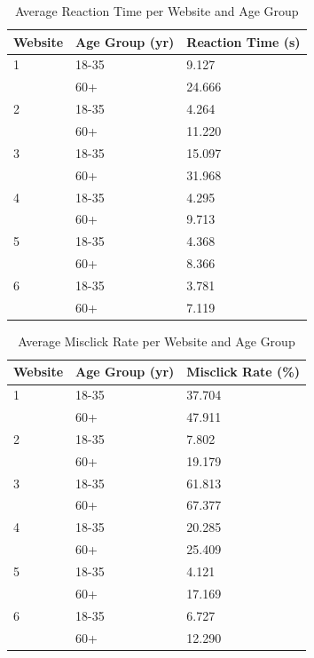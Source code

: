 \documentclass[12pt,twoside]{reedthesis}
\begin{document}
    \begin{table}[H]
        \centering
        \begin{tabular}{| p{3.5cm} | p{3.5cm} | p{3.5cm}|}
            \hline
            Website & Age Group (yr) & Reaction Time (s)\\
            \hline
            1 & 18-35 & 9.127\\
            \hline
            & 60+ & 24.666\\
            \hline
            2 & 18-35 & 4.264\\
            \hline
            & 60+ & 11.220\\
            \hline
            3 & 18-35 & 15.097\\
            \hline
            & 60+ & 31.968\\
            \hline
            4 & 18-35 &  4.295\\
            \hline
            & 60+ & 9.713\\
            \hline
            5 & 18-35 &  4.368\\
            \hline
            & 60+ & 8.366\\
            \hline
            6 & 18-35 &  3.781\\
            \hline
            & 60+ & 7.119\\
            \hline
        \end{tabular}
        \caption{Average Reaction Time per Website and Age Group}
        \label{avg_speed_age}
    \end{table}

    \begin{table}[H]
        \centering
        \begin{tabular}{| p{3.5cm} | p{3.5cm} | p{3.5cm}|}
            \hline
            Website & Age Group (yr) & Misclick Rate (\%)\\
            \hline
            1 & 18-35 & 37.704\\
            \hline
            & 60+ & 47.911\\
            \hline
            2 & 18-35 & 7.802\\
            \hline
            & 60+ & 19.179\\
            \hline
            3 & 18-35 & 61.813\\
            \hline
            & 60+ & 67.377\\
            \hline
            4 & 18-35 &  20.285\\
            \hline
            & 60+ & 25.409\\
            \hline
            5 & 18-35 &  4.121\\
            \hline
            & 60+ & 17.169\\
            \hline
            6 & 18-35 & 6.727\\
            \hline
            & 60+ & 12.290\\
            \hline
        \end{tabular}
        \caption{Average Misclick Rate per Website and Age Group}
        \label{avg_mr_age}
    \end{table}
    
\end{document}
